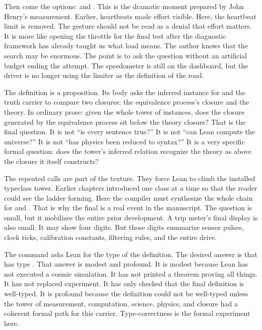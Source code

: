 Then come the options:  and
. This is the dramatic moment
prepared by John Henry's measurement. Earlier, heartbeats made effort visible.
Here, the heartbeat limit is removed. The gesture should not be read as a
denial that effort matters. It is more like opening the throttle for the final
test after the diagnostic framework has already taught us what load means. The
author knows that the search may be enormous. The point is to ask the question
without an artificial budget ending the attempt. The speedometer is still on
the dashboard, but the driver is no longer using the limiter as the definition
of the road.

The definition  is a proposition. Its body asks the
inferred instance for  and the truth carrier to compare two
closures: the equivalence process's closure and the theory. In ordinary prose:
given the whole tower of instances, does the closure generated by the
equivalence process sit below the theory closure? That is the final question.
It is not ``is every sentence true?'' It is not ``can Lean compute the
universe?'' It is not ``has physics been reduced to syntax?'' It is a very
specific formal question: does the tower's inferred relation recognize the
theory as above the closure it itself constructs?

The repeated  calls are part of the texture. They force
Lean to climb the installed typeclass tower. Earlier chapters introduced one
class at a time so that the reader could see the ladder forming. Here the
compiler must synthesize the whole chain for  and .
That is why the final  is a real event in the manuscript. The
question is small, but it mobilizes the entire prior development. A trip
meter's final display is also small. It may show four digits. But those digits
summarize sensor pulses, clock ticks, calibration constants, filtering rules,
and the entire drive.

The command  asks Lean for the type of the
definition. The desired answer is that  has type
. That answer is modest and profound. It is modest because Lean has
not executed a cosmic simulation. It has not printed a theorem proving all
things. It has not replaced experiment. It has only checked that the final
definition is well-typed. It is profound because the definition could not be
well-typed unless the tower of measurement, computation, science, physics, and
closure had a coherent formal path for this carrier. Type-correctness is the
formal experiment here.


